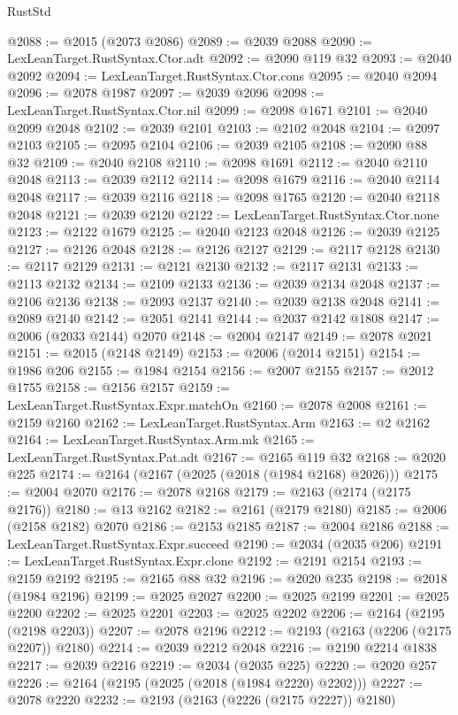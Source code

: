 \begin{lexlean}{RustStd}
\begin{coremodule}
@2088 := @2015 (@2073 @2086)
@2089 := @2039 @2088
@2090 := LexLeanTarget.RustSyntax.Ctor.adt
@2092 := @2090 @119 @32
@2093 := @2040 @2092
@2094 := LexLeanTarget.RustSyntax.Ctor.cons
@2095 := @2040 @2094
@2096 := @2078 @1987
@2097 := @2039 @2096
@2098 := LexLeanTarget.RustSyntax.Ctor.nil
@2099 := @2098 @1671
@2101 := @2040 @2099 @2048
@2102 := @2039 @2101
@2103 := @2102 @2048
@2104 := @2097 @2103
@2105 := @2095 @2104
@2106 := @2039 @2105
@2108 := @2090 @88 @32
@2109 := @2040 @2108
@2110 := @2098 @1691
@2112 := @2040 @2110 @2048
@2113 := @2039 @2112
@2114 := @2098 @1679
@2116 := @2040 @2114 @2048
@2117 := @2039 @2116
@2118 := @2098 @1765
@2120 := @2040 @2118 @2048
@2121 := @2039 @2120
@2122 := LexLeanTarget.RustSyntax.Ctor.none
@2123 := @2122 @1679
@2125 := @2040 @2123 @2048
@2126 := @2039 @2125
@2127 := @2126 @2048
@2128 := @2126 @2127
@2129 := @2117 @2128
@2130 := @2117 @2129
@2131 := @2121 @2130
@2132 := @2117 @2131
@2133 := @2113 @2132
@2134 := @2109 @2133
@2136 := @2039 @2134 @2048
@2137 := @2106 @2136
@2138 := @2093 @2137
@2140 := @2039 @2138 @2048
@2141 := @2089 @2140
@2142 := @2051 @2141
@2144 := @2037 @2142 @1808
@2147 := @2006 (@2033 @2144) @2070
@2148 := @2004 @2147
@2149 := @2078 @2021
@2151 := @2015 (@2148 @2149)
@2153 := @2006 (@2014 @2151)
@2154 := @1986 @206
@2155 := @1984 @2154
@2156 := @2007 @2155
@2157 := @2012 @1755
@2158 := @2156 @2157
@2159 := LexLeanTarget.RustSyntax.Expr.matchOn
@2160 := @2078 @2008
@2161 := @2159 @2160
@2162 := LexLeanTarget.RustSyntax.Arm
@2163 := @2 @2162
@2164 := LexLeanTarget.RustSyntax.Arm.mk
@2165 := LexLeanTarget.RustSyntax.Pat.adt
@2167 := @2165 @119 @32
@2168 := @2020 @225
@2174 := @2164 (@2167 (@2025 (@2018 (@1984 @2168) @2026)))
@2175 := @2004 @2070
@2176 := @2078 @2168
@2179 := @2163 (@2174 (@2175 @2176))
@2180 := @13 @2162
@2182 := @2161 (@2179 @2180)
@2185 := @2006 (@2158 @2182) @2070
@2186 := @2153 @2185
@2187 := @2004 @2186
@2188 := LexLeanTarget.RustSyntax.Expr.succeed
@2190 := @2034 (@2035 @206)
@2191 := LexLeanTarget.RustSyntax.Expr.clone
@2192 := @2191 @2154
@2193 := @2159 @2192
@2195 := @2165 @88 @32
@2196 := @2020 @235
@2198 := @2018 (@1984 @2196)
@2199 := @2025 @2027
@2200 := @2025 @2199
@2201 := @2025 @2200
@2202 := @2025 @2201
@2203 := @2025 @2202
@2206 := @2164 (@2195 (@2198 @2203))
@2207 := @2078 @2196
@2212 := @2193 (@2163 (@2206 (@2175 @2207)) @2180)
@2214 := @2039 @2212 @2048
@2216 := @2190 @2214 @1838
@2217 := @2039 @2216
@2219 := @2034 (@2035 @225)
@2220 := @2020 @257
@2226 := @2164 (@2195 (@2025 (@2018 (@1984 @2220) @2202)))
@2227 := @2078 @2220
@2232 := @2193 (@2163 (@2226 (@2175 @2227)) @2180)

\end{coremodule}
\end{lexlean}
